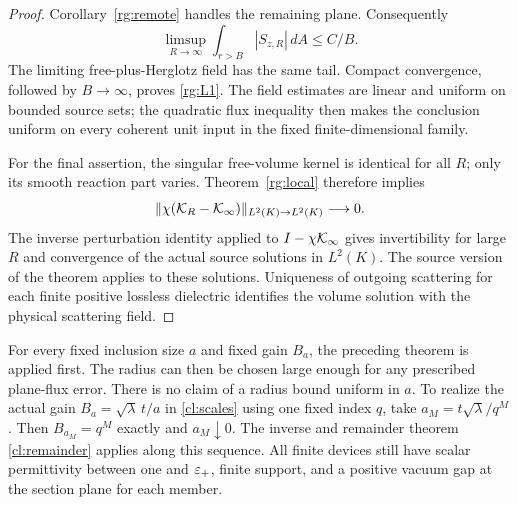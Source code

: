 \begin{proof}
Corollary~\ref{rg:remote} handles the remaining plane.
Consequently
\[
 \limsup_{R\to\infty}\int_{r>B}|S_{z,R}|\,dA\leq C/B.
\]
The limiting free-plus-Herglotz field has the same tail.
Compact convergence, followed by $B\to\infty$, proves
\eqref{rg:L1}. The field estimates are linear and uniform on
bounded source sets; the quadratic flux inequality then makes
the conclusion uniform on every coherent unit input in the
fixed finite-dimensional family.

For the final assertion, the singular free-volume kernel is
identical for all $R$; only its smooth reaction part varies.
Theorem~\ref{rg:local} therefore implies
\[
 \|\chi({\cal K}_R-{\cal K}_\infty)\|_{L^2(K)\to L^2(K)}
       \longrightarrow0.
\]
The inverse perturbation identity applied to
$I-\chi{\cal K}_\infty$ gives invertibility for large $R$
and convergence of the actual source solutions in $L^2(K)$.
The source version of the theorem applies to these solutions.
Uniqueness of outgoing scattering for each finite positive
lossless dielectric identifies the volume solution with the
physical scattering field.
\end{proof}

\begin{remark}
\label{rg:diagonal}
For every fixed inclusion size $a$ and fixed gain $B_a$, the
preceding theorem is applied first. The radius can then be
chosen large enough for any prescribed plane-flux error.
There is no claim of a radius bound uniform in $a$.
To realize the actual gain $B_a=\sqrt\lambda\,t/a$ in
\eqref{cl:scales} using one fixed index $q$, take
$a_M=t\sqrt\lambda/q^M$. Then $B_{a_M}=q^M$ exactly and
$a_M\downarrow0$. The inverse and remainder theorem
\ref{cl:remainder} applies along this sequence. All finite
devices still have scalar permittivity between one and
$\varepsilon_+$, finite support, and a positive vacuum gap at the
section plane for each member.
\end{remark}
